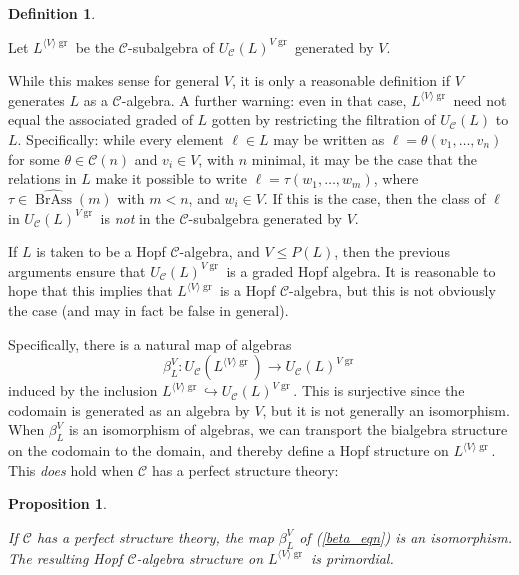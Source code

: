 \documentclass[12pt]{article}
\DeclareMathOperator{\BrAss}{BrAss}
\DeclareMathOperator{\gr}{gr}
\newcommand{\BrAsshat}{\widehat{\BrAss}} %
\newcommand{\CC} {\mathcal{C}}
\newcommand{\beqn}{\begin{equation}}
\newcommand{\eeqn}{\end{equation}}
\theoremstyle{plain}
\newtheorem{prop}[thm]{Proposition}
\theoremstyle{definition}
\newtheorem{defn}[thm]{Definition}
\theoremstyle{remark}
\begin{document}
\begin{defn} \label{langlerangle_defn}

Let $L^{\langle V \rangle \gr}$ be the $\CC$-subalgebra of $U_{\CC}(L)^{V \gr}$ generated by $V$.

\end{defn}

While this makes sense for general $V$, it is only a reasonable definition if $V$ generates $L$ as a $\CC$-algebra.  A further warning: even in that case, $L^{\langle V \rangle \gr}$ need not equal the associated graded of $L$ gotten by restricting the filtration of $U_{\CC}(L)$ to $L$.  Specifically: while every element $\ell \in L$ may be written as $\ell = \theta(v_1, \dots, v_n)$ for some $\theta \in \CC(n)$ and $v_i \in V$, with $n$ minimal, it may be the case that the relations in $L$ make it possible to write $\ell = \tau(w_1, \dots, w_m)$, where $\tau \in \BrAsshat(m)$ with $m < n$, and $w_i \in V$.  If this is the case, then the class of $\ell$ in $U_{\CC}(L)^{V \gr}$ is \emph{not} in the $\CC$-subalgebra generated by $V$.

If $L$ is taken to be a Hopf $\CC$-algebra, and $V \leq P(L)$, then the previous arguments ensure that $U_{\CC}(L)^{V\gr}$ is a graded Hopf algebra.  It is reasonable to hope that this implies that $L^{\langle V \rangle \gr}$ is a Hopf $\CC$-algebra, but this is not obviously the case (and may in fact be false in general).  

Specifically, there is a natural map of algebras
%
\beqn \beta_L^V: U_{\CC}(L^{\langle V \rangle \gr}) \to U_{\CC}(L)^{V\gr} \label{beta_eqn} \eeqn
%
induced by the inclusion $L^{\langle V \rangle \gr} \hookrightarrow U_{\CC}(L)^{V\gr}$.  This is surjective since the codomain is generated as an algebra by $V$, but it is not generally an isomorphism.  When $\beta_L^V$ is an isomorphism of algebras, we can transport the bialgebra structure on the codomain to the domain, and thereby define a Hopf structure on $L^{\langle V \rangle \gr}$.  This \emph{does} hold when $\CC$ has a perfect structure theory: 

\begin{prop} \label{perfect_enveloping_prop}

If $\CC$ has a perfect structure theory, the map $\beta_L^V$ of (\ref{beta_eqn}) is an isomorphism.  The resulting Hopf $\CC$-algebra structure on $L^{\langle V \rangle \gr}$ is primordial.

\end{prop}
\end{document}
